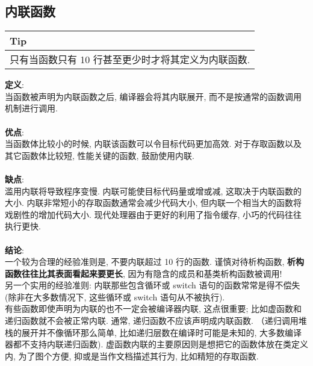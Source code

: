 \documentclass[a4paper,11pt,CJK]{article}
\begin{document}
\begin{CJK}{UTF8}{gbsn}
\subsection{内联函数}
\begin{table}[htbp]
\flushleft
\begin{tabular}{p{400pt}}
\toprule
\rowcolor[gray]{.8} Tip \\
\midrule
只有当函数只有 10 行甚至更少时才将其定义为内联函数. \\
\bottomrule
\end{tabular}
\end{table}
\noindent
\textbf{定义}: \\
\indent 当函数被声明为内联函数之后, 编译器会将其内联展开, 而不是按通常的函数调用机制进行调用. \\
\\
\textbf{优点}: \\
\indent 当函数体比较小的时候, 内联该函数可以令目标代码更加高效. 对于存取函数以及其它函数体比较短, 性能关键的函数, 鼓励使用内联. \\
\\
\textbf{缺点}: \\
\indent 滥用内联将导致程序变慢. 内联可能使目标代码量或增或减, 这取决于内联函数的大小. 内联非常短小的存取函数通常会减少代码大小, 但内联一个相当大的函数将戏剧性的增加代码大小. 现代处理器由于更好的利用了指令缓存, 小巧的代码往往执行更快.\\
\\
\textbf{结论}: \\
\indent 一个较为合理的经验准则是, 不要内联超过 10 行的函数. 谨慎对待析构函数, \textbf{析构函数往往比其表面看起来要更长}, 因为有隐含的成员和基类析构函数被调用! \\
\indent 另一个实用的经验准则: 内联那些包含循环或 switch 语句的函数常常是得不偿失 (除非在大多数情况下, 这些循环或 switch 语句从不被执行). \\
\indent 有些函数即使声明为内联的也不一定会被编译器内联, 这点很重要; 比如虚函数和递归函数就不会被正常内联. 通常, 递归函数不应该声明成内联函数. （递归调用堆栈的展开并不像循环那么简单, 比如递归层数在编译时可能是未知的, 大多数编译器都不支持内联递归函数). 虚函数内联的主要原因则是想把它的函数体放在类定义内, 为了图个方便, 抑或是当作文档描述其行为, 比如精短的存取函数.


\end{CJK}
\end{document}
